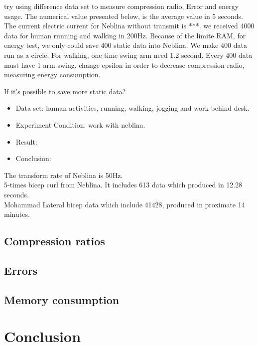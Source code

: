 \documentclass[10pt, conference, compsocconf]{IEEEtran}
\newcommand{\todo}[1]{\marginpar{\parbox{18mm}{\flushleft\tiny\color{red}\textbf{TODO}:
      #1}}}
\begin{document}
\todo{ update }
try using difference data set to measure compression radio, Error
and energy usage. The numerical value presented below, is the
average value in 5 seconds. The current electric current for Neblina
without transmit is ***. we received 4000 data for human running and
walking in 200Hz. Because of the limite RAM, for energy test, we only
could save 400 static data into Neblina. We make 400 data run as a circle.
For walking, one time swing arm need 1.2 second. Every 400 data must have 1 arm swing.
change epsilon in order to decrease compression radio, measuring energy consumption.

\todo {running}
If it's possible to save more static data?



\begin{itemize}
    \item Data set: human activities, running, walking, jogging and work behind desk.
    \item Experiment Condition: work with neblina.
    \item Result:
    \item Conclusion:
\end{itemize}



The transform rate of Neblina is 50Hz.
\\
5-times bicep curl from Neblina. It includes 613 data which produced in 12.28 seconds.
\\
Mohammad Lateral bicep data which include 41428, produced in proximate 14 minutes.

\subsection{Compression ratios}

\subsection{Errors}

\subsection{Memory consumption}

\section{Conclusion}
\end{document}
